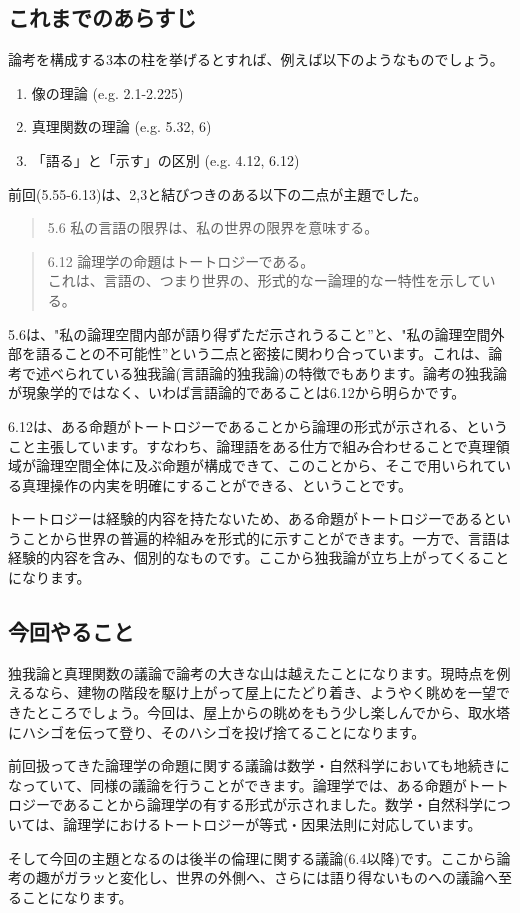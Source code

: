 \documentclass[12pt]{jsarticle}
\begin{document}
\subsection*{これまでのあらすじ}
論考を構成する3本の柱を挙げるとすれば、例えば以下のようなものでしょう。
\begin{enumerate}
\item 像の理論 (e.g. 2.1-2.225)
\item 真理関数の理論 (e.g. 5.32, 6)
\item 「語る」と「示す」の区別 (e.g. 4.12, 6.12)
\end{enumerate}
\par
前回(5.55-6.13)は、2,3と結びつきのある以下の二点が主題でした。
\begin{quote}
5.6 私の言語の限界は、私の世界の限界を意味する。
\end{quote}
\begin{quote}
6.12 論理学の命題はトートロジーである。\\
これは、言語の、つまり世界の、形式的なー論理的なー特性を示している。
\end{quote}
\par
5.6は、"私の論理空間内部が語り得ずただ示されうること”と、"私の論理空間外部を語ることの不可能性”という二点と密接に関わり合っています。これは、論考で述べられている独我論(言語論的独我論)の特徴でもあります。論考の独我論が現象学的ではなく、いわば言語論的であることは6.12から明らかです。 
\par
6.12は、ある命題がトートロジーであることから論理の形式が示される、ということ主張しています。すなわち、論理語をある仕方で組み合わせることで真理領域が論理空間全体に及ぶ命題が構成できて、このことから、そこで用いられている真理操作の内実を明確にすることができる、ということです。 
\par
トートロジーは経験的内容を持たないため、ある命題がトートロジーであるということから世界の普遍的枠組みを形式的に示すことができます。一方で、言語は経験的内容を含み、個別的なものです。ここから独我論が立ち上がってくることになります。 

\subsection*{今回やること}
独我論と真理関数の議論で論考の大きな山は越えたことになります。現時点を例えるなら、建物の階段を駆け上がって屋上にたどり着き、ようやく眺めを一望できたところでしょう。今回は、屋上からの眺めをもう少し楽しんでから、取水塔にハシゴを伝って登り、そのハシゴを投げ捨てることになります。
\par
前回扱ってきた論理学の命題に関する議論は数学・自然科学においても地続きになっていて、同様の議論を行うことができます。論理学では、ある命題がトートロジーであることから論理学の有する形式が示されました。数学・自然科学については、論理学におけるトートロジーが等式・因果法則に対応しています。
\par
そして今回の主題となるのは後半の倫理に関する議論(6.4以降)です。ここから論考の趣がガラッと変化し、世界の外側へ、さらには語り得ないものへの議論へ至ることになります。
\end{document}
